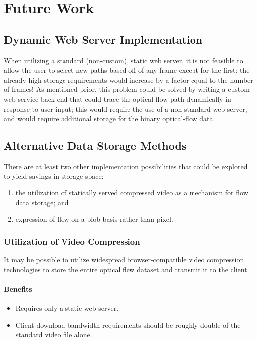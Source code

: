 
\chapter{Future Work}


\section{Dynamic Web Server Implementation}
When utilizing a standard (non-custom), static web server, it is not feasible to allow the user to select new paths based off of any frame except for the first: the already-high storage requirements would increase by a factor equal to the number of frames! As mentioned prior, this problem could be solved by writing a custom web service back-end that could trace the optical flow path dynamically in response to user input; this would require the use of a non-standard web server, and would require additional storage for the binary optical-flow data.

\section{Alternative Data Storage Methods}
There are at least two other implementation possibilities that could be explored to yield savings in storage space:
\begin{enumerate}
    \item the utilization of statically served compressed video as a mechanism for flow data storage; and
    \item expression of flow on a blob basis rather than pixel.
\end{enumerate}

\subsection{Utilization of Video Compression}
It may be possible to utilize widespread browser-compatible video compression technologies to store the entire optical flow dataset and transmit it to the client.

\subsubsection{Benefits}
\begin{itemize}
\item Requires only a static web server.
\item Client download bandwidth requirements should be roughly double of the standard video file alone.
\end{itemize}

